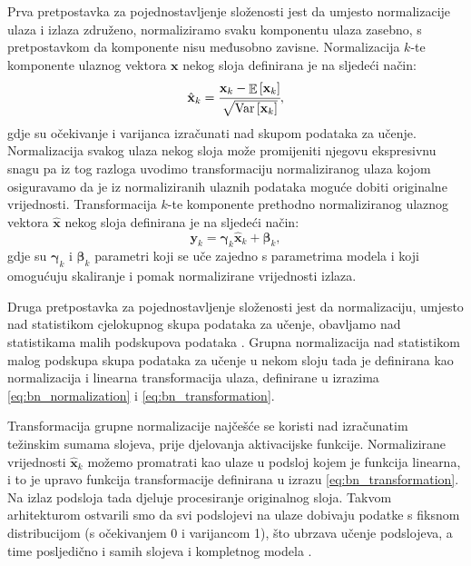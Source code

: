 \documentclass[times, utf8, diplomski, numeric]{fer}
\begin{document}
Prva pretpostavka za pojednostavljenje složenosti jest da umjesto normalizacije ulaza i izlaza združeno, normaliziramo svaku komponentu ulaza zasebno, s pretpostavkom da komponente nisu međusobno zavisne.
Normalizacija $k$-te komponente ulaznog vektora $\mathbf{x}$ nekog sloja definirana je na sljedeći način:
\begin{equation}
 \hat{\mathbf{x}}_{k} = \cfrac{\mathbf{x}_{k} - \mathop{\mathbb{E}} \left[ \mathbf{x}_{k} \right]} {\sqrt{ \mathrm{Var} \left[ \mathbf{x}_{k} \right] } }, \label{eq:bn_normalization}
\end{equation}
gdje su očekivanje i varijanca izračunati nad skupom podataka za učenje.
Normalizacija svakog ulaza nekog sloja može promijeniti njegovu ekspresivnu snagu pa iz tog razloga uvodimo transformaciju normaliziranog ulaza kojom osiguravamo da je iz normaliziranih ulaznih podataka moguće dobiti originalne vrijednosti.
Transformacija $k$-te komponente prethodno normaliziranog ulaznog vektora $\hat{\mathbf{x}}$ nekog sloja definirana je na sljedeći način:
\begin{equation}
 \mathbf{y}_{k} = \boldsymbol{\gamma}_{k} \hat{\mathbf{x}}_{k} + \boldsymbol{\beta}_{k}, \label{eq:bn_transformation}
\end{equation}
gdje su $\boldsymbol{\gamma}_{k}$ i $\boldsymbol{\beta}_{k}$ parametri koji se uče zajedno s parametrima modela i koji omogućuju skaliranje i pomak normalizirane vrijednosti izlaza.

Druga pretpostavka za pojednostavljenje složenosti jest da normalizaciju, umjesto nad statistikom cjelokupnog skupa podataka za učenje, obavljamo nad statistikama malih podskupova podataka .
Grupna normalizacija nad statistikom malog podskupa skupa podataka za učenje u nekom sloju tada je definirana kao normalizacija i linearna transformacija ulaza, definirane u izrazima \ref{eq:bn_normalization} i \ref{eq:bn_transformation}.

Transformacija grupne normalizacije najčešće se koristi nad izračunatim težinskim sumama slojeva, prije djelovanja aktivacijske funkcije.
Normalizirane vrijednosti $\hat{\mathbf{x}}_{k}$ možemo promatrati kao ulaze u podsloj kojem je funkcija linearna, i to je upravo funkcija transformacije definirana u izrazu \ref{eq:bn_transformation}.
Na izlaz podsloja tada djeluje procesiranje originalnog sloja. 
Takvom arhitekturom ostvarili smo da svi podslojevi na ulaze dobivaju podatke s fiksnom distribucijom (s očekivanjem 0 i varijancom 1), što ubrzava učenje podslojeva, a time posljedično i samih slojeva i kompletnog modela \citep{article:bn_paper} \citep{seminar:rela}.
\end{document}
